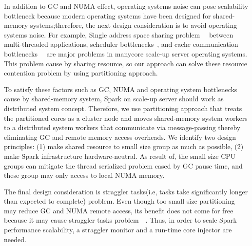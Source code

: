 In addition to GC and NUMA effect, operating systems noise can pose scalability
bottleneck because modern operating systems have been designed for shared-memory
systems;therefore, the next design consideration is to avoid operating systems noise.
For example, Single address space sharing problem~\cite{AustinTClements2012RCUBalancedTrees}~\cite{Clements2013RadixVM} between multi-threaded
applications, scheduler bottlenecks~\cite{Lozi2016LSD}, and cache
communication bottlenecks~\cite{SilasBoydWickizerPth}~\cite{Hendler2010FC} are major problems in manycore scale-up server
operating systems.
This problem cause by sharing resource, so our approach can solve these
resource contention problem by using partitioning approach.

To satisfy these factors such as GC, NUMA and operating system
bottlenecks cause by shared-memory system, Spark on scale-up server should work
as distributed system concept.
Therefore, we use partitioning approach that treats the partitioned cores as a cluster
node and moves shared-memory system workers to a distributed system workers that communicate
via message-passing thereby eliminating GC and remote memory access overheads.
We identify two design principles: (1) make shared resource to small size group
as much as possible, (2) make Spark infrastructure hardware-neutral.
As result of, the small size CPU groups can mitigate the thread
serialized problem cased by GC pause time, and these group may only access to local NUMA memory.

\ifkor
The final design consideration is straggler tasks(i.e, tasks take
significantly longer than expected to complete) problem.
Even though too small size partitioning may reduce GC and NUMA remote access, its benefit
does not come for free because it may cause straggler tasks
problem~\cite{Ousterhout2015MSP}~\cite{Ren2015HDS}.
Thus, in order to scale Spark performance scalability, a straggler monitor and a
run-time core injector are needed.
\else

